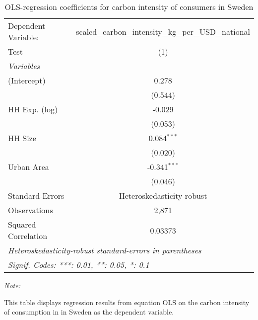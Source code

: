 
\begin{table}[htbp!]
   \centering
   \small
   \begin{adjustbox}{width = 1\textwidth, max height = 0.95\textheight, center}
      \begin{threeparttable}[b]
         \caption{\label{tab:OLS_1_SWE} OLS-regression coefficients for carbon intensity of consumers in Sweden}
         \begin{tabular}{lc}
            \tabularnewline \midrule \midrule
            Dependent Variable: & scaled\_carbon\_intensity\_kg\_per\_USD\_national\\        
            Test                & (1)\\  
            \midrule
            \emph{Variables}\\
            (Intercept)         & 0.278\\   
                                & (0.544)\\   
            HH Exp. (log)       & -0.029\\   
                                & (0.053)\\   
            HH Size             & 0.084$^{***}$\\   
                                & (0.020)\\   
            Urban Area          & -0.341$^{***}$\\   
                                & (0.046)\\   
            \midrule 
            Standard-Errors     & Heteroskedasticity-robust \\   
            Observations        & 2,871\\  
            Squared Correlation & 0.03373\\  
            \midrule \midrule
            \multicolumn{2}{l}{\emph{Heteroskedasticity-robust standard-errors in parentheses}}\\
            \multicolumn{2}{l}{\emph{Signif. Codes: ***: 0.01, **: 0.05, *: 0.1}}\\
         \end{tabular}
         
         \begin{tablenotes}\item \medskip \textit{Note:}
            \item This table displays regression results from equation OLS on the carbon intensity of consumption in  in Sweden as the dependent variable. 
         \end{tablenotes}
      \end{threeparttable}
   \end{adjustbox}
\end{table}


